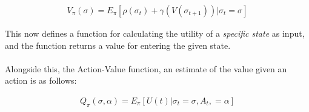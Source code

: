 \documentclass[ %
                    author={Ashwinder Khurana},
                supervisor={Prof Dave Cliff},
                    degree={MEng},
                     title={The Deeply Reinforced Trader},
                  subtitle={},
                      type={enterprise},
                      year={2020} ]{dissertation}
\begin{document}
{\begin{equation}
\label{expected-discounted-rewards-rephrased}
\begin{split}
V_\pi (\sigma) = E_\pi [\rho(\sigma_t) + \gamma(V( \sigma_{t+1})) | \sigma_t = \sigma ]
\end{split}
\end{equation}

\noindent 
This now defines a function for calculating the utility of a \textit{specific state} as input, and the function returns a value for entering the given state.
\\
\\
Alongside this, the Action-Value function, an estimate of the value given an action is as follows:


\begin{equation}
\label{action-value}
\begin{split}
Q_\pi(\sigma , \alpha) = E_\pi [U(t) | \sigma_t = \sigma, A_t, = \alpha]
\end{split}
\end{equation}


}
\end{document}
